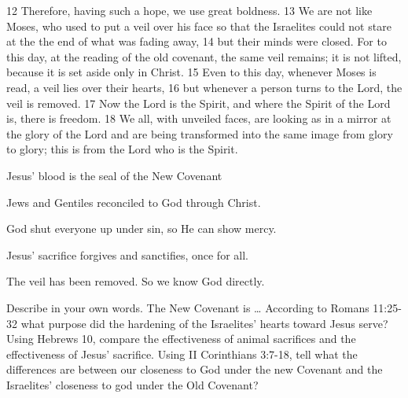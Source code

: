 \begin{bible}
12 Therefore, having such a hope, we use great boldness. 13 We are not like Moses, who used to put a veil over his face so that the Israelites could not stare at the the end of what was fading away, 14 but their minds were closed. For to this day, at the reading of the old covenant, the same veil remains; it is not lifted, because it is set aside only in Christ. 15 Even to this day, whenever Moses is read, a veil lies over their hearts, 16 but whenever a person turns to the Lord, the veil is removed. 17 Now the Lord is the Spirit, and where the Spirit of the Lord is, there is freedom. 18 We all, with unveiled faces, are looking as in a mirror at the glory of the Lord and are being transformed into the same image from glory to glory; this is from the Lord who is the Spirit.
\end{bible}

\begin{discussion}



 Jesus' blood is the seal of the New Covenant

 Jews and Gentiles reconciled to God through Christ.


 God shut everyone up under sin, so He can show mercy.


 Jesus' sacrifice forgives and sanctifies, once for all.


 The veil has been removed.  So we know God directly.

\end{discussion}

\begin{questions}
\q Describe in your own words.  The New Covenant is \ldots
\q According to Romans 11:25-32 what purpose did the hardening of the Israelites' hearts toward Jesus serve?
\q Using Hebrews 10, compare the effectiveness of animal sacrifices and the effectiveness of Jesus' sacrifice.
\q Using II Corinthians 3:7-18, tell what the differences are between our closeness to God under the new Covenant and the Israelites' closeness to god under the Old Covenant?
\end{questions}